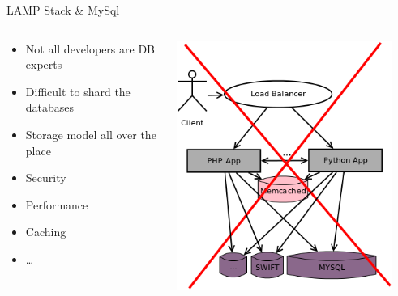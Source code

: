\documentclass[aspectratio=169]{beamer}
\begin{document}
\begin{frame}{LAMP Stack \& MySql}
    \begin{columns}
        \begin{column}[c]{0.6\textwidth}
            \begin{itemize}
                \item Not all developers are DB experts
                \item Difficult to shard the databases
                \item Storage model all over the place
                \item Security
                \item Performance
                \item Caching
                \item \dots
            \end{itemize}
        \end{column}
        \begin{column}[c]{0.4\textwidth}
            \includegraphics[width=0.9\textwidth]{images/oldstorageusage.png}
        \end{column}
    \end{columns}
\end{frame}
\end{document}
